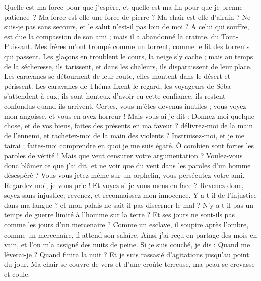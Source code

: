 \begin{multicols}{2}
Quelle est ma force pour que j’espère, et quelle est ma fin pour que je prenne patience ?
Ma force est-elle une force de pierre ? Ma chair est-elle d'airain ?
Ne suis-je pas sans secours, et le salut n'est-il pas loin de moi ?
A celui qui souffre, est due la compassion de son ami ; mais il a abandonné la crainte.  du Tout-Puissant.
Mes frères m'ont trompé comme un torrent, comme le lit des torrents qui passent.
Les glaçons en troublent le cours, la neige s'y cache ;
mais au temps de la sécheresse, ils tarissent, et dans les chaleurs, ils disparaissent de leur place.
Les caravanes se détournent de leur route, elles montent dans le désert et périssent.
Les caravanes de Théma fixent le regard, les voyageurs de Séba s'attendent à eux;
ils sont honteux d'avoir eu cette confiance, ils restent confondus quand ils arrivent.
Certes, vous m'êtes devenus inutiles ; vous voyez mon angoisse, et vous en avez horreur !
Mais vous ai-je dit : Donnez-moi quelque chose, et de vos biens, faites des présents en ma faveur ? 
délivrez-moi de la main de l'ennemi, et rachetez-moi de la main des violents ?
Instruisez-moi, et je me tairai ; faites-moi comprendre en quoi je me suis égaré.
Ô combien sont fortes les paroles de vérité ! Mais que veut censurer votre argumentation ?
Voulez-vous donc blâmer ce que j'ai dit, et ne voir que du vent dans les paroles d'un homme désespéré ?
Vous vous jetez même sur un orphelin, vous persécutez votre ami.
Regardez-moi, je vous prie ! Et voyez si je vous mens en face ?
Revenez donc, soyez sans injustice; revenez, et reconnaissez mon innocence.
Y a-t-il de l'injustice dans ma langue ? et mon palais ne sait-il pas discerner le mal ? 
\VerseOne{}N'y a-t-il pas un temps de guerre limité à l'homme sur la terre ? Et ses jours ne sont-ils pas comme les jours d'un mercenaire ?
Comme un esclave, il soupire après l'ombre, comme un mercenaire, il attend son salaire.
Ainsi j'ai reçu en partage des mois en vain, et l'on m'a assigné des nuits de peine.
Si je suis couché, je dis : Quand me lèverai-je ? Quand finira la nuit ? Et je suis rassasié d'agitations jusqu'au point du jour.
Ma chair se couvre de vers et d'une croûte terreuse, ma peau se crevasse et coule.

\end{multicols}
